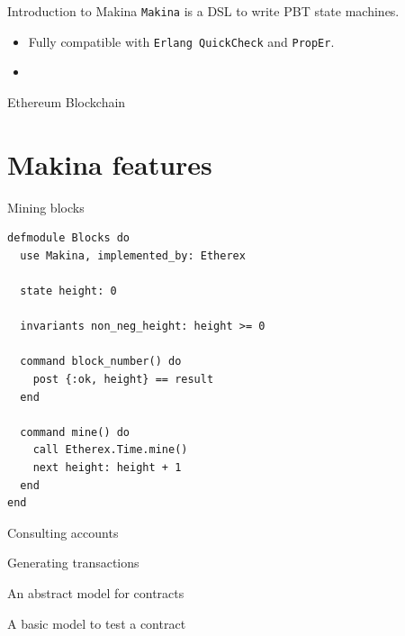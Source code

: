 \documentclass[aspectratio=169, 10pt]{beamer}
\begin{document}
\begin{frame}[label={sec:org2cb6ddc},fragile]{Introduction to Makina}
 \texttt{Makina} is a DSL to write PBT state machines.
\begin{itemize}
\item Fully compatible with \texttt{Erlang QuickCheck} and \texttt{PropEr}.
\item 
\end{itemize}
\end{frame}


\begin{frame}[label={sec:orgaef6427}]{Ethereum Blockchain}
\end{frame}

\section{Makina features}
\label{sec:org13fd8f6}

\begin{frame}[label={sec:org2afa1f8},fragile]{Mining blocks}
 \lstset{language=elixir,label= ,caption= ,captionpos=b,numbers=none,style=display}
\begin{lstlisting}
defmodule Blocks do
  use Makina, implemented_by: Etherex

  state height: 0

  invariants non_neg_height: height >= 0

  command block_number() do
    post {:ok, height} == result
  end

  command mine() do
    call Etherex.Time.mine()
    next height: height + 1
  end
end
\end{lstlisting}
\end{frame}

\begin{frame}[label={sec:orgbbc06d6}]{Consulting accounts}
\end{frame}

\begin{frame}[label={sec:orgeed3946}]{Generating transactions}
\end{frame}

\begin{frame}[label={sec:orgb100e30}]{An abstract model for contracts}
\end{frame}

\begin{frame}[label={sec:org0d7ef1f}]{A basic model to test a contract}
\end{frame}
\end{document}
